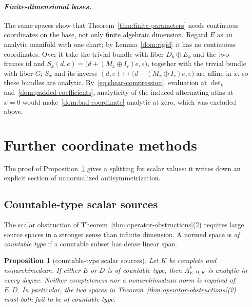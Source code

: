 \documentclass[11pt]{amsart}
\newtheorem{proposition}[theorem]{Proposition}
\theoremstyle{definition}
\theoremstyle{remark}
\numberwithin{equation}{section}
\newcommand{\id}{\mathrm{id}}
\theoremstyle{plain}
\theoremstyle{definition}
\theoremstyle{plain}
\begin{document}
\paragraph{\textit{Finite-dimensional bases.}}
The same spaces show that Theorem~\ref{thm:finite-parameters} needs continuous coordinates on the base,
not only finite algebraic dimension. Regard $E$ as an analytic manifold with one chart; by Lemma~\ref{dom:rigid} it has no
continuous coordinates. Over it take the trivial bundle with fiber $D_k\oplus E_k$ and the two frames
$\id$ and $S_x(d,e)=\bigl(d+(M_x\oplus I_r)e,e\bigr)$, together with the trivial bundle with fiber $G$;
$S_x$ and its inverse $(d,e)\mapsto\bigl(d-(M_x\oplus I_r)e,e\bigr)$ are affine in $x$, so these bundles
are analytic. By~\eqref{eq:shear-compression}, evaluation at $\det_k$
and~\eqref{dom:padded-coefficients}, analyticity of the induced alternating atlas at $x=0$ would
make~\eqref{dom:bad-coordinate} analytic at zero, which was excluded above.
\section{Further coordinate methods}\label{app:coordinate-methods}
The proof of Proposition~\ref{prop:scalar-countable} gives a splitting for scalar values: it writes down an explicit section of unnormalized antisymmetrization.

\subsection{Countable-type scalar sources}
The scalar obstruction of Theorem~\ref{thm:operator-obstructions}(2) requires large source spaces in a stronger sense than infinite dimension.
A normed space is \emph{of countable type} if a countable subset has dense linear span.

\begin{proposition}[countable-type scalar sources]\label{prop:scalar-countable}
Let $K$ be complete and nonarchimedean. If either $E$ or $D$ is of countable type, then
$A^k_{E,D;K}$ is analytic in every degree. Neither completeness nor a nonarchimedean norm
is required of $E,D$. In particular, the two spaces in
Theorem~\ref{thm:operator-obstructions}(2) must both fail to be of countable type.
\end{proposition}
\end{document}
